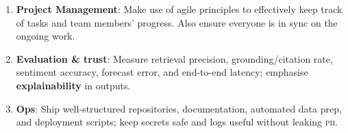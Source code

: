 \begin{enumerate}[label=(\alph*)]
  \item \textbf{Project Management}: Make use of agile principles to effectively keep track of tasks and team members' progress. Also ensure everyone is in sync on the ongoing work.
  \item \textbf{Evaluation \& trust}: Measure retrieval precision, grounding/citation rate, sentiment accuracy, forecast error, and end-to-end latency; emphasise \textbf{explainability} in outputs.
  \item \textbf{Ops}: Ship well-structured repositories, documentation, automated data prep, and deployment scripts; keep secrets safe and logs useful without leaking \textsc{pii}.
\end{enumerate}
